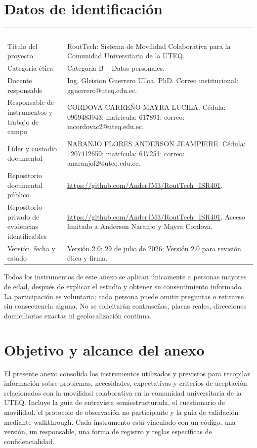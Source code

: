 \documentclass[10pt,a4paper]{article}
\makeatletter
\newcommand{\Proyecto}{RoutTech: Sistema de Movilidad Colaborativa para la Comunidad Universitaria de la UTEQ}
\newcommand{\CategoriaEtica}{Categoría B -- Datos personales}
\newcommand{\FechaDocumento}{29 de julio de 2026}
\newcommand{\VersionDocumento}{2.0}
\newcommand{\EstadoDocumento}{Versión 2.0 para revisión ética y firma}
\newcommand{\RepositorioPublico}{https://github.com/AnderJM3/RoutTech_ISR401}
\newcommand{\Docente}{Ing. Gleiston Guerrero Ulloa, PhD}
\newcommand{\CorreoDocente}{gguerrero@uteq.edu.ec}
\newcommand{\Anderson}{NARANJO FLORES ANDERSON JEAMPIERE}
\newcommand{\CedulaAnderson}{1207412659}
\newcommand{\MatriculaAnderson}{617251}
\newcommand{\CorreoAnderson}{anaranjof2@uteq.edu.ec}
\newcommand{\Mayra}{CORDOVA CARREÑO MAYRA LUCILA}
\newcommand{\CedulaMayra}{0969483943}
\newcommand{\MatriculaMayra}{617891}
\newcommand{\CorreoMayra}{mcordovac2@uteq.edu.ec}
\makeatother
\begin{document}
\section{Datos de identificación}

\noindent\begin{tabularx}{\textwidth}{L{4.6cm} J}
\textcolor{white}{\textbf{Campo}} & \textcolor{white}{\textbf{Información}}\\
Título del proyecto & \Proyecto.\\
Categoría ética & \CategoriaEtica.\\
Docente responsable & \Docente. Correo institucional: \CorreoDocente.\\
Responsable de instrumentos y trabajo de campo & \Mayra. Cédula: \CedulaMayra; matrícula: \MatriculaMayra; correo: \CorreoMayra.\\
Líder y custodio documental & \Anderson. Cédula: \CedulaAnderson; matrícula: \MatriculaAnderson; correo: \CorreoAnderson.\\
Repositorio documental público & \url{\RepositorioPublico}.\\
Repositorio privado de evidencias identificables & \url{https://github.com/AnderJM3/RoutTech_ISR401}. Acceso limitado a Anderson Naranjo y Mayra Cordova.\\
Versión, fecha y estado & Versión \VersionDocumento; \FechaDocumento; \EstadoDocumento.\\
\end{tabularx}

\begin{EthicsBox}
Todos los instrumentos de este anexo se aplican únicamente a personas mayores de edad, después de explicar el estudio y obtener su consentimiento informado. La participación es voluntaria; cada persona puede omitir preguntas o retirarse sin consecuencia alguna. No se solicitarán contraseñas, placas reales, direcciones domiciliarias exactas ni geolocalización continua.
\end{EthicsBox}

\section{Objetivo y alcance del anexo}

El presente anexo consolida los instrumentos utilizados y previstos para recopilar información sobre problemas, necesidades, expectativas y criterios de aceptación relacionados con la movilidad colaborativa en la comunidad universitaria de la UTEQ. Incluye la guía de entrevista semiestructurada, el cuestionario de movilidad, el protocolo de observación no participante y la guía de validación mediante walkthrough. Cada instrumento está vinculado con un código, una versión, un responsable, una forma de registro y reglas específicas de confidencialidad.
\end{document}

